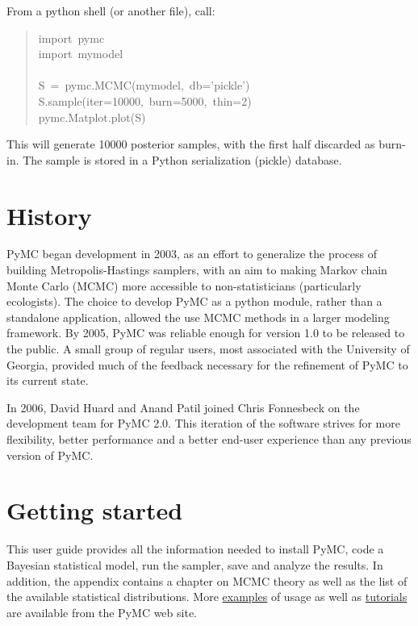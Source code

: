 From a python shell (or another file), call:
\begin{quote}{\ttfamily \raggedright \noindent
import~pymc~\\
import~mymodel~\\
~\\
S~=~pymc.MCMC(mymodel,~db='pickle')~\\
S.sample(iter=10000,~burn=5000,~thin=2)~\\
pymc.Matplot.plot(S)
}\end{quote}

This will generate 10000 posterior samples, with the first half discarded as burn-in. The sample is stored in a Python serialization (pickle) database.



\hypertarget{history}{}
\section*{History}
\label{history}

PyMC began development in 2003, as an effort to generalize the process of building Metropolis-Hastings samplers, with an aim to making Markov chain Monte Carlo (MCMC) more accessible to non-statisticians (particularly ecologists). The choice to develop PyMC as a python module, rather than a standalone application, allowed the use MCMC methods in a larger modeling framework. By 2005, PyMC was reliable enough for version 1.0 to be released to the public. A small group of regular users, most associated with the University of Georgia, provided much of the feedback necessary for the refinement of PyMC to its current state.

In 2006, David Huard and Anand Patil joined Chris Fonnesbeck on the development team for PyMC 2.0. This iteration of the software strives for more flexibility, better performance and a better end-user experience than any previous version of PyMC.



\hypertarget{getting-started}{}
\section*{Getting started}
\label{getting-started}

This user guide provides all the information needed to install PyMC, code
a Bayesian statistical model, run the sampler, save and analyze the results.
In addition, the appendix contains a chapter on MCMC theory as well as the list of the
available statistical distributions. More \href{http://code.google.com/p/pymc/}{examples} of usage as well as
\href{http://code.google.com/p/pymc/wiki/TutorialsAndRecipes}{tutorials}  are available from the PyMC web site.



